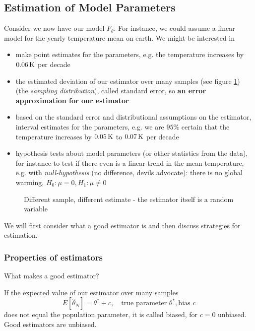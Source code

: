 \subsection{Estimation of Model Parameters}
Consider we now have our model $F_\theta$. For instance, 
we could assume a linear model for the yearly temperature mean
on earth. We might be interested in
\begin{itemize}
    \item make point estimates for the parameters, e.g. the temperature increases by $0.06\operatorname{K}$ per decade
    \item the estimated deviation of our estimator over many samples (see figure \ref{fig:dif_sam_dif_est}) (the \textit{sampling distribution}), called standard error, so \textbf{an error approximation for our estimator}
    \item based on the standard error and distributional assumptions on the estimator, interval estimates for the parameters,
    e.g. we are $95\%$ certain that the temperature increases by $0.05\operatorname{K}$ to $0.07\operatorname{K}$ per decade
    \item hypothesis tests about model parameters (or other statistics from the data), for instance to test if there even is a linear trend
    in the mean temperature, e.g. with \textit{null-hypothesis} (no difference, devils advocate): there is no global warming, $H_0:\mu = 0, H_1:\mu\neq 0$
\end{itemize}

\begin{figure}[!htb]
 \centering
 \hfill
 \caption{Different sample, different estimate - the estimator itself is a random variable}
 \label{fig:dif_sam_dif_est}
\end{figure}

We will first consider what a good estimator is and then discuss strategies for estimation.

\subsubsection{Properties of estimators}
What makes a good estimator?

If the expected value of our estimator over many samples
\begin{equation}
    E[\hat{\theta}_N] = \theta^* + c, \quad \text{true parameter } \theta^*, \text{bias } c
\end{equation}
does not equal the population parameter, it is called biased, for $c = 0$ unbiased.
Good estimators are unbiased.

